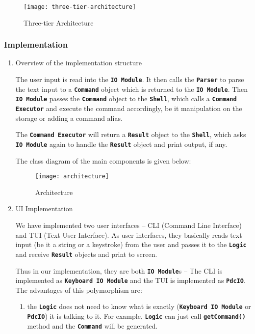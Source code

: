 \documentclass[12pt, a4paper]{article}
\newcommand{\cmdinline}[1]{{\bf \texttt{#1}}}
\begin{document}
\begin{figure}[h]
  \centering
  \texttt{[image: three-tier-architecture]}
  \caption{Three-tier Architecture}
\end{figure}

\subsubsection{Implementation}
\begin{enumerate}
\item  Overview of the implementation structure

The user input is read into the \cmdinline{IO Module}. It then calls the \cmdinline{Parser} to parse the text input to a
\cmdinline{Command} object which is  returned to the \cmdinline{IO Module}. Then \cmdinline{IO Module} passes the \cmdinline{Command} object to
the \cmdinline{Shell}, which calls a \cmdinline{Command Executor} and execute the command accordingly, be it manipulation on the storage or adding a command alias.

The \cmdinline{Command Executor} will return a \cmdinline{Result} object to the \cmdinline{Shell}, which asks \cmdinline{IO Module} again to handle the \cmdinline{Result} object and print output, if any.

The class diagram of the main components is given below:
\begin{figure}[h]
  \centering
  \texttt{[image: architecture]}
  \caption{Architecture}
\end{figure}

\newpage
\item UI Implementation

We have implemented two user interfaces -- CLI (Command Line Interface) and TUI (Text User Interface). 
As user interfaces, they basically reads text input (be it a string or a keystroke) from the user and passes it to the \cmdinline{Logic} and receive \cmdinline{Result} objects and print to screen. 

Thus in our implementation, they are both \cmdinline{IO Module}s  -- The CLI is implemented as \cmdinline{Keyboard IO Module} and the TUI is implemented as \cmdinline{PdcIO}. The advantages of this polymorphism are:
\begin{enumerate}
\item the \cmdinline{Logic} does not need to know what is exactly (\cmdinline{Keyboard IO Module} or \cmdinline{PdcIO}) it is talking to it. For example, \cmdinline{Logic} can just call \cmdinline{getCommand()} method and the \cmdinline{Command} will be generated.


\end{enumerate}
\end{enumerate}
\end{document}
